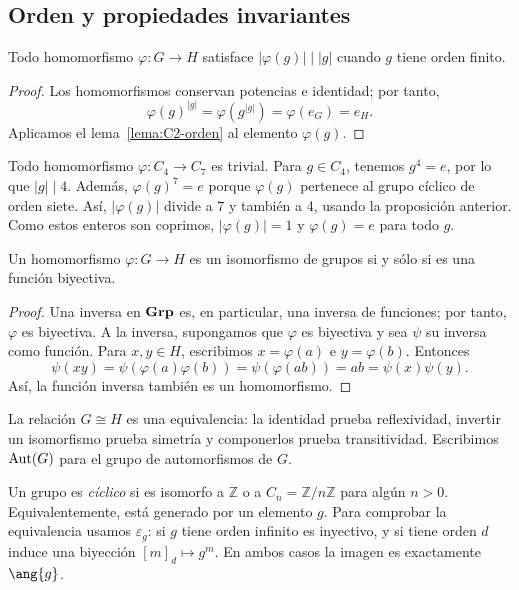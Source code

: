 \subsection{Orden y propiedades invariantes}\label{tema:3-2-1}
\begin{prop}\label{prop:C3-orden-imagen}
Todo homomorfismo $\varphi:G\to H$ satisface $|\varphi(g)|\mid |g|$ cuando $g$ tiene orden finito.
\end{prop}
\begin{proof}
Los homomorfismos conservan potencias e identidad; por tanto,
\[
\varphi(g)^{|g|}=\varphi(g^{|g|})=\varphi(e_G)=e_H.
\]
Aplicamos el lema~\ref{lema:C2-orden} al elemento $\varphi(g)$.
\end{proof}
\begin{ejem}
Todo homomorfismo $\varphi:C_4\to C_7$ es trivial. Para $g\in C_4$, tenemos $g^4=e$, por lo que $|g|\mid4$. Además, $\varphi(g)^7=e$ porque $\varphi(g)$ pertenece al grupo cíclico de orden siete. Así, $|\varphi(g)|$ divide a $7$ y también a $4$, usando la proposición anterior. Como estos enteros son coprimos, $|\varphi(g)|=1$ y $\varphi(g)=e$ para todo $g$.
\end{ejem}

\begin{prop}\label{prop:C3-iso}
Un homomorfismo $\varphi:G\to H$ es un isomorfismo de grupos si y sólo si es una función biyectiva.
\end{prop}
\begin{proof}
Una inversa en $\mathbf{Grp}$ es, en particular, una inversa de funciones; por tanto, $\varphi$ es biyectiva. A la inversa, supongamos que $\varphi$ es biyectiva y sea $\psi$ su inversa como función. Para $x,y\in H$, escribimos $x=\varphi(a)$ e $y=\varphi(b)$. Entonces
\[
\psi(xy)=\psi(\varphi(a)\varphi(b))
=\psi(\varphi(ab))=ab=\psi(x)\psi(y).
\]
Así, la función inversa también es un homomorfismo.
\end{proof}
La relación $G\cong H$ es una equivalencia: la identidad prueba reflexividad, invertir un isomorfismo prueba simetría y componerlos prueba transitividad. Escribimos $\operatorname{Aut}(G)$ para el grupo de automorfismos de $G$.

Un grupo es \emph{cíclico} si es isomorfo a $\mathbb Z$ o a $C_n=\mathbb Z/n\mathbb Z$ para algún $n>0$. Equivalentemente, está generado por un elemento $g$. Para comprobar la equivalencia usamos $\varepsilon_g$: si $g$ tiene orden infinito es inyectivo, y si tiene orden $d$ induce una biyección $[m]_d\mapsto g^m$. En ambos casos la imagen es exactamente $\ang{g}$.

